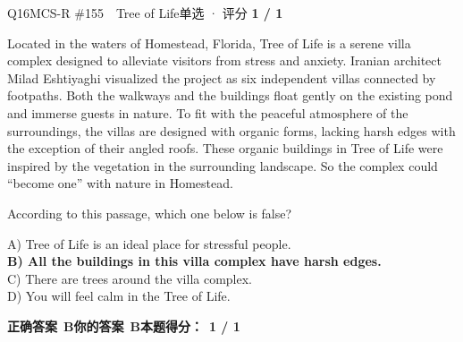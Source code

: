 \begin{qblock}{Q16\quad MCS-R \#155\ \ Tree of Life}{单选 · 评分 \textcolor{cAccent}{\bfseries 1 / 1}}
\begin{promptbox}
Located in the waters of Homestead, Florida, Tree of Life is a serene villa complex designed to alleviate visitors from stress and anxiety. Iranian architect Milad Eshtiyaghi visualized the project as six independent villas connected by footpaths. Both the walkways and the buildings float gently on the existing pond and immerse guests in nature. To fit with the peaceful atmosphere of the surroundings, the villas are designed with organic forms, lacking harsh edges with the exception of their angled roofs. These organic buildings in Tree of Life were inspired by the vegetation in the surrounding landscape. So the complex could ``become one'' with nature in Homestead.
\end{promptbox}
\begin{notebox}According to this passage, which one below is false?\end{notebox}
{\small
A) Tree of Life is an ideal place for stressful people.\\
{\color{cFix}\textbf{B) All the buildings in this villa complex have harsh edges.}}\\
C) There are trees around the villa complex.\\
D) You will feel calm in the Tree of Life.}
\par\smallskip
\textbf{正确答案}\ \textcolor{cFix}{\bfseries B}\qquad\textbf{你的答案}\ \textcolor{cFix}{\bfseries B}\qquad\textbf{本题得分：}\ {\color{cAccent}\bfseries 1 / 1}
\end{qblock}
